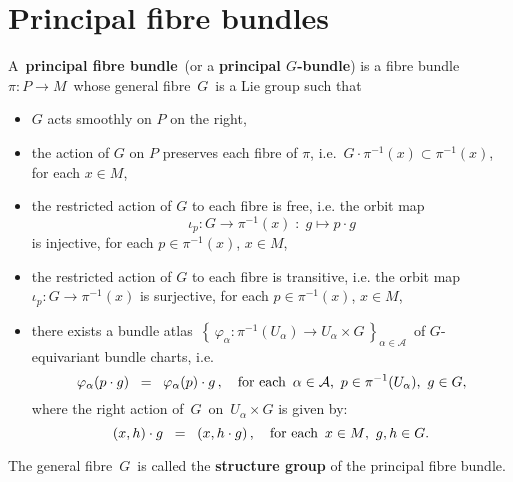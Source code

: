 

\section{Principal fibre bundles}
\setcounter{theorem}{0}
\setcounter{equation}{0}


\renewcommand{\theenumi}{\roman{enumi}}
\renewcommand{\labelenumi}{\textnormal{(\theenumi)}$\;\;$}


\begin{definition}
\mbox{}
\vskip 0.1cm
\noindent
A \,\textbf{principal fibre bundle}\, (or a \textbf{principal $G$-bundle})
is a fibre bundle \,$\pi : P \longrightarrow M$\,
whose general fibre \,$G$\, is a Lie group such that
\begin{itemize}
\item
	$G$ acts smoothly on $P$ {\color{red}on the right},
\item
	the action of $G$ on $P$ preserves each fibre of $\pi$, i.e. \,$G\cdot\pi^{-1}(x) \subset \pi^{-1}(x)$,\,
	for each $x \in M$,
\item
	the restricted action of $G$ to each fibre is free, i.e.
	the orbit map
	\begin{equation*}
	\iota_{p} : G \longrightarrow \pi^{-1}(x) \; : \; g \longmapsto p \cdot g
	\end{equation*}
	is injective,
	for each $p \in \pi^{-1}(x)$, $x \in M$,
\item
	the restricted action of $G$ to each fibre is transitive, i.e.
	the orbit map $\iota_{p} : G \longrightarrow \pi^{-1}(x)$ is surjective,
	for each $p \in \pi^{-1}(x)$, $x \in M$,
\item
	there exists a bundle atlas
	\,$\left\{\,\varphi_{\alpha} : \pi^{-1}(U_{\alpha}) \longrightarrow U_{\alpha} \times G\,\right\}_{\alpha\in\mathcal{A}}$\,
	of {\color{red}$G$-equivariant bundle charts}, i.e.
	\begin{equation*}
	\varphi_{\alpha}(p \cdot g) \;\; = \;\; \varphi_{\alpha}(p) \cdot g\,,
	\quad
	\textnormal{for each \,$\alpha \in \mathcal{A}$, \,$p \in \pi^{-1}(U_{\alpha})$, \,$g \in G$},
	\end{equation*}
	where the right action of \,$G$\, on \,$U_{\alpha} \times G$ is given by:
	\begin{equation*}
	(x,h) \cdot g \;\; = \;\; (x,h \cdot g)\,,
	\quad
	\textnormal{for each \,$x \in M$, \,$g,h \in G$}.
	\end{equation*}
\end{itemize}
The general fibre \,$G$\, is called the \textbf{structure group} of the principal fibre bundle.
\end{definition}

